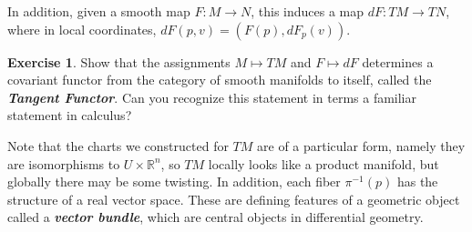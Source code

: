 \documentclass[psamsfonts]{amsart}
\theoremstyle{definition}
\newtheorem{exer}[thm]{Exercise}
\theoremstyle{remark}
\newcommand{\R}{\mathbb{R}}
\newcommand{\ib}[1]{\textbf{\textit{#1}}}
\newcommand{\inv}{^{-1}}
\begin{document}
%
In addition, given a smooth map $F : M \to N$, this induces a map
$dF : TM \to TN$, where in local coordinates, $dF(p,v) = (F(p), dF_p(v))$.
%
\begin{exer}
Show that the assignments $M \mapsto TM$ and $F \mapsto dF$ determines
a covariant functor from the category of smooth manifolds to itself,
called the \ib{Tangent Functor}. Can you recognize this statement in
terms a familiar statement in calculus?
\end{exer}
%
Note that the charts we constructed for $TM$ are of a particular form,
namely they are isomorphisms to $U \times \R^n$, so $TM$ locally looks
like a product manifold, but globally there may be some twisting. In
addition, each fiber $\pi\inv(p)$ has the structure of a real vector
space. These are defining features of a geometric object called a
\ib{vector bundle}, which are central objects in differential geometry.
%
\end{document}
